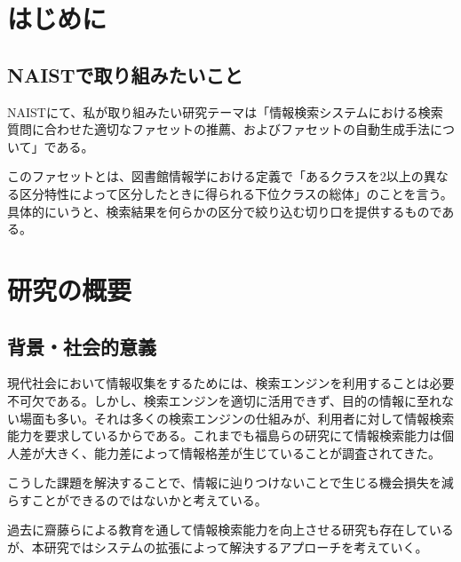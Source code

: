 \documentclass[a4j,10pt, twocolumn]{jarticle}
\begin{document}
\section{はじめに}
\subsection{NAISTで取り組みたいこと}
NAISTにて、私が取り組みたい研究テーマは「情報検索システムにおける検索質問に合わせた適切なファセットの推薦、およびファセットの自動生成手法について」である。

このファセットとは、図書館情報学における定義で「あるクラスを2以上の異なる区分特性によって区分したときに得られる下位クラスの総体\cite{libdic}」のことを言う。具体的にいうと、検索結果を何らかの区分で絞り込む切り口を提供するものである。
\section{研究の概要}
\subsection{背景・社会的意義}
 現代社会において情報収集をするためには、検索エンジンを利用することは必要不可欠である。しかし、検索エンジンを適切に活用できず、目的の情報に至れない場面も多い。それは多くの検索エンジンの仕組みが、利用者に対して情報検索能力を要求しているからである。これまでも福島らの研究にて情報検索能力は個人差が大きく、能力差によって情報格差が生じていることが調査されてきた\cite{fukushima}。

 こうした課題を解決することで、情報に辿りつけないことで生じる機会損失を減らすことができるのではないかと考えている。
 
 過去に齋藤らによる教育を通して情報検索能力を向上させる研究\cite{saito}も存在しているが、本研究ではシステムの拡張によって解決するアプローチを考えていく。
\end{document}
